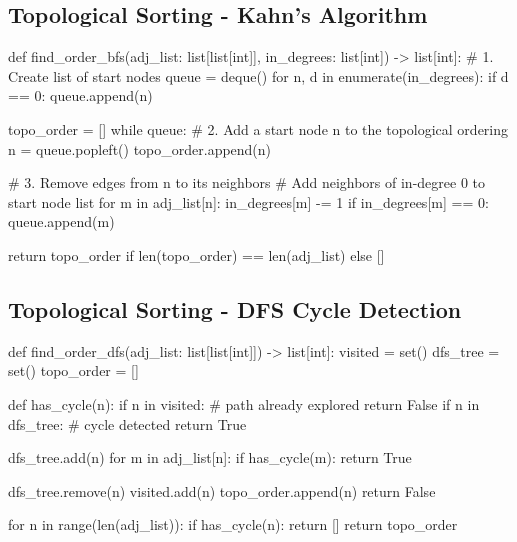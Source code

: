 \documentclass[12pt]{article}
\begin{document}
\subsection{Topological Sorting - Kahn's Algorithm}
\begin{python}
def find_order_bfs(adj_list: list[list[int]],
                   in_degrees: list[int]) -> list[int]:
    # 1. Create list of start nodes
    queue = deque()
    for n, d in enumerate(in_degrees):
        if d == 0:
            queue.append(n)

    topo_order = []
    while queue:
        # 2. Add a start node n to the topological ordering
        n = queue.popleft()
        topo_order.append(n)

        # 3. Remove edges from n to its neighbors
        #    Add neighbors of in-degree 0 to start node list
        for m in adj_list[n]:
            in_degrees[m] -= 1
            if in_degrees[m] == 0:
                queue.append(m)

    return topo_order if len(topo_order) == len(adj_list) else []
\end{python}

\subsection{Topological Sorting - DFS Cycle Detection}
\begin{python}
def find_order_dfs(adj_list: list[list[int]]) -> list[int]:
    visited = set()
    dfs_tree = set()
    topo_order = []

    def has_cycle(n):
        if n in visited:  # path already explored
            return False
        if n in dfs_tree:  # cycle detected
            return True

        dfs_tree.add(n)
        for m in adj_list[n]:
            if has_cycle(m):
                return True

        dfs_tree.remove(n)
        visited.add(n)
        topo_order.append(n)
        return False

    for n in range(len(adj_list)):
        if has_cycle(n):
            return []
    return topo_order
\end{python}
\end{document}

